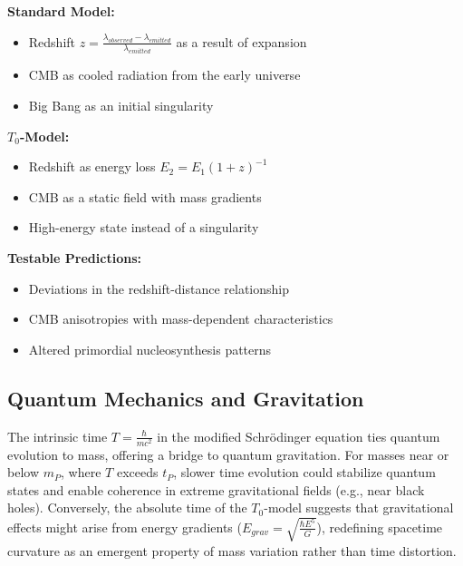 \documentclass[a4paper,12pt]{article}
\begin{document}
	\begin{tcolorbox}[colback=green!5!white,colframe=green!75!black,title=Reinterpretation of Cosmological Phenomena]
		\textbf{Standard Model:}
		\begin{itemize}
			\item Redshift $z = \frac{\lambda_{observed} - \lambda_{emitted}}{\lambda_{emitted}}$ as a result of expansion
			\item CMB as cooled radiation from the early universe
			\item Big Bang as an initial singularity
		\end{itemize}
		
		\textbf{$T_0$-Model:}
		\begin{itemize}
			\item Redshift as energy loss $E_2 = E_1(1+z)^{-1}$
			\item CMB as a static field with mass gradients
			\item High-energy state instead of a singularity
		\end{itemize}
		
		\textbf{Testable Predictions:}
		\begin{itemize}
			\item Deviations in the redshift-distance relationship
			\item CMB anisotropies with mass-dependent characteristics
			\item Altered primordial nucleosynthesis patterns
		\end{itemize}
	\end{tcolorbox}
	
	\subsection{Quantum Mechanics and Gravitation}
	The intrinsic time \( T = \frac{\hbar}{m c^2} \) in the modified Schrödinger equation ties quantum evolution to mass, offering a bridge to quantum gravitation. For masses near or below \( m_P \), where \( T \) exceeds \( t_P \), slower time evolution could stabilize quantum states and enable coherence in extreme gravitational fields (e.g., near black holes). Conversely, the absolute time of the \( T_0 \)-model suggests that gravitational effects might arise from energy gradients (\( E_{grav} = \sqrt{\frac{\hbar E^5}{G}} \)), redefining spacetime curvature as an emergent property of mass variation rather than time distortion.
	
\end{document}
